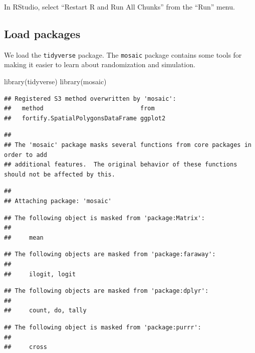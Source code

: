 \documentclass[
]{book}
\newenvironment{Shaded}{\begin{snugshade}}{\end{snugshade}}
\newcommand{\FunctionTok}[1]{\textcolor[rgb]{0.00,0.00,0.00}{#1}}
\newcommand{\NormalTok}[1]{#1}
\begin{document}
In RStudio, select ``Restart R and Run All Chunks'' from the ``Run'' menu.

\hypertarget{randomization1-load}{%
\subsection{Load packages}\label{randomization1-load}}

We load the \texttt{tidyverse} package. The \texttt{mosaic} package contains some tools for making it easier to learn about randomization and simulation.

\begin{Shaded}
\begin{Highlighting}[]
\FunctionTok{library}\NormalTok{(tidyverse)}
\FunctionTok{library}\NormalTok{(mosaic)}
\end{Highlighting}
\end{Shaded}

\begin{verbatim}
## Registered S3 method overwritten by 'mosaic':
##   method                           from   
##   fortify.SpatialPolygonsDataFrame ggplot2
\end{verbatim}

\begin{verbatim}
## 
## The 'mosaic' package masks several functions from core packages in order to add 
## additional features.  The original behavior of these functions should not be affected by this.
\end{verbatim}

\begin{verbatim}
## 
## Attaching package: 'mosaic'
\end{verbatim}

\begin{verbatim}
## The following object is masked from 'package:Matrix':
## 
##     mean
\end{verbatim}

\begin{verbatim}
## The following objects are masked from 'package:faraway':
## 
##     ilogit, logit
\end{verbatim}

\begin{verbatim}
## The following objects are masked from 'package:dplyr':
## 
##     count, do, tally
\end{verbatim}

\begin{verbatim}
## The following object is masked from 'package:purrr':
## 
##     cross
\end{verbatim}
\end{document}
